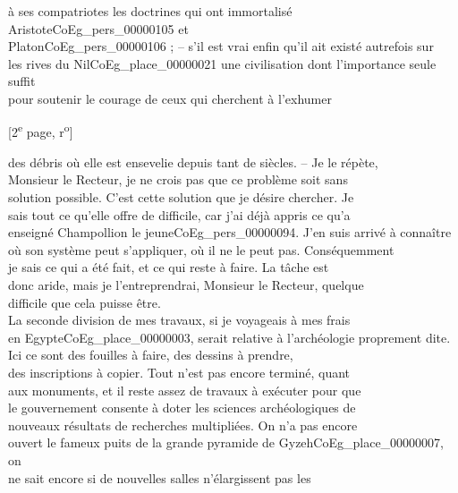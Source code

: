\documentclass{book}
\begin{document}
à ses compatriotes les doctrines qui ont immortalisé Aristote\gls{CoEg_pers_00000105} et\\
Platon\gls{CoEg_pers_00000106} ; – s’il est vrai enfin qu’il ait existé autrefois sur\\
les rives du Nil\gls{CoEg_place_00000021} une civilisation dont l’importance seule suffit\\
pour soutenir le courage de ceux qui cherchent à l’exhumer
{\footnotesize \begin{center} {[2\textsuperscript{e} page, r\textsuperscript{o}]}\end{center}}
\noindent des débris où elle est ensevelie depuis tant de siècles. – Je le répète,\\
Monsieur le Recteur, je ne crois pas que ce problème soit sans\\
solution possible. C’est cette solution que je désire chercher. Je\\
sais tout ce qu’elle offre de difficile, car j’ai déjà appris ce qu’a\\
enseigné Champollion le jeune\gls{CoEg_pers_00000094}. J’en suis arrivé à connaître\\
où son système peut s’appliquer, où il ne le peut pas. Conséquemment\\
je sais ce qui a été fait, et ce qui reste à faire. La tâche est\\
donc aride, mais je l’entreprendrai, Monsieur le Recteur, quelque\\
difficile que cela puisse être.\\
\indent La seconde division de mes travaux, si je voyageais à mes frais\\
en Egypte\gls{CoEg_place_00000003}, serait relative à l’archéologie proprement dite.\\
\indent Ici ce sont des fouilles à faire, des dessins à prendre,\\
des inscriptions à copier. Tout n’est pas encore terminé, quant\\
aux monuments, et il reste assez de travaux à exécuter pour que\\
le gouvernement consente à doter les sciences archéologiques de\\
nouveaux résultats de recherches multipliées. On n’a pas encore\\
ouvert le fameux puits de la grande pyramide de Gyzeh\gls{CoEg_place_00000007}, on\\
ne sait encore si de nouvelles salles n’élargissent pas les\\
\end{document}

